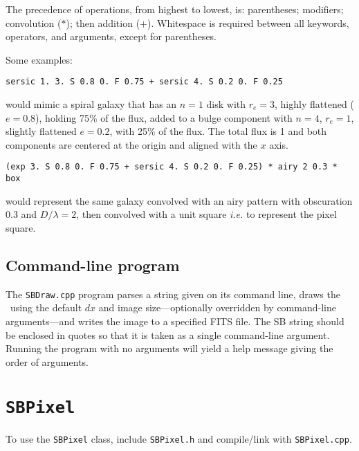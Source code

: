 \documentclass[11pt,preprint,flushrt]{aastex}
\begin{document}
The precedence of operations, from highest to lowest, is: parentheses; modifiers; convolution ($*$); then addition ($+$).  Whitespace is required between all keywords, operators, and arguments, except for parentheses.

Some examples:
\begin{verbatim}
sersic 1. 3. S 0.8 0. F 0.75 + sersic 4. S 0.2 0. F 0.25
\end{verbatim}
would mimic a spiral galaxy that has an $n=1$ disk with $r_e=3$, highly flattened ($e=0.8$), holding 75\% of the flux, added to a bulge component with $n=4$, $r_e=1$, slightly flattened $e=0.2$, with 25\% of the flux.  The total flux is 1 and both components are centered at the origin and aligned with the $x$ axis.
\begin{verbatim}
(exp 3. S 0.8 0. F 0.75 + sersic 4. S 0.2 0. F 0.25) * airy 2 0.3 * box
\end{verbatim}
would represent the same galaxy convolved with an airy pattern with obscuration 0.3 and $D/\lambda=2$, then convolved with a unit square {\it i.e.} to represent the pixel square.

\subsection{Command-line program}
The {\tt SBDraw.cpp} program parses a string given on its command line, draws the \sbp\ using the default $dx$ and image size---optionally overridden by command-line arguments---and writes the image to a specified FITS file.   The SB string should be enclosed in quotes so that it is taken as a single command-line argument.  Running the program with no arguments will yield a help message giving the order of arguments.

\section{{\tt SBPixel}}
\label{sbpixel}
To use the {\tt SBPixel} class, include {\tt SBPixel.h} and compile/link with {\tt SBPixel.cpp}.
\end{document}

